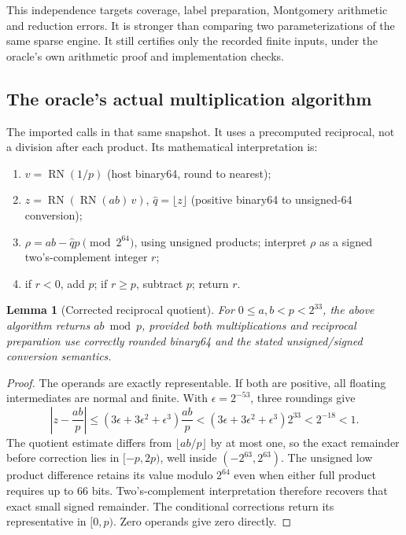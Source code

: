 \documentclass[11pt]{article}
\newtheorem{lemma}[theorem]{Lemma}
\theoremstyle{definition}\newtheorem{remark}[theorem]{Remark}
\begin{document}
This independence targets coverage, label preparation, Montgomery arithmetic
and reduction errors. It is stronger than comparing two parameterizations
of the same sparse engine. It still certifies only the recorded finite
inputs, under the oracle's own arithmetic proof and implementation checks.

\subsection{The oracle's actual multiplication algorithm}\label{sec:oracle}
The imported 
calls  in that same snapshot.
It uses a precomputed reciprocal,
not a division after each product. Its mathematical interpretation is:
\begin{enumerate}
\setlength{\itemsep}{0pt}
\item $v=\operatorname{RN}(1/p)$ (host binary64, round to nearest);
\item $z=\operatorname{RN}(\operatorname{RN}(a b)\,v)$,
$\widehat q=\lfloor z\rfloor$ (positive binary64 to unsigned-64 conversion);
\item $\rho=ab-\widehat q p\pmod {2^{64}}$, using unsigned products;
interpret $\rho$ as a signed two's-complement integer $r$;
\item if $r<0$, add $p$; if $r\ge p$, subtract $p$; return $r$.
\end{enumerate}
\begin{lemma}[Corrected reciprocal quotient]\label{lem:oracle}
For $0\le a,b<p<2^{33}$, the above algorithm returns $ab\bmod p$,
provided both multiplications and reciprocal preparation use correctly
rounded binary64 and the stated unsigned/signed conversion semantics.
\end{lemma}
\begin{proof}
The operands are exactly representable. If both are positive, all
floating intermediates are normal and finite. With $\epsilon=2^{-53}$,
three roundings give
\[
 \left|z-\frac{ab}{p}\right|
 \le (3\epsilon+3\epsilon^2+\epsilon^3)\frac{ab}{p}
 <(3\epsilon+3\epsilon^2+\epsilon^3)2^{33}<2^{-18}<1.
\]
The quotient estimate differs from $\lfloor ab/p\rfloor$ by at most one,
so the exact remainder before correction lies in $[-p,2p)$, well inside
$(-2^{63},2^{63})$. The unsigned low product difference retains its value
modulo $2^{64}$ even when either full product requires up to 66 bits.
Two's-complement interpretation therefore recovers that exact small
signed remainder. The conditional corrections return its representative
in $[0,p)$. Zero operands give zero directly.
\end{proof}
\end{document}
